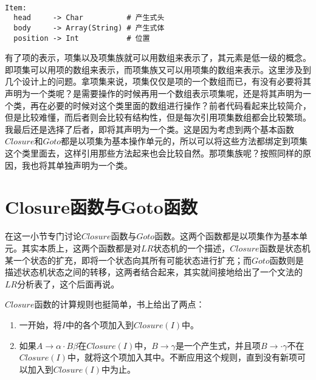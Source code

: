 \begin{verbatim}

Item:
  head     -> Char          # 产生式头
  body     -> Array(String) # 产生式体
  position -> Int           # 位置
\end{verbatim}

有了项的表示，项集以及项集族就可以用数组来表示了，其元素是低一级的概念。即项集可以用项的数组来表示，而项集族又可以用项集的数组来表示。这里涉及到几个设计上的问题。拿项集来说，项集仅仅是项的一个数组而已，有没有必要将其声明为一个类呢？是需要操作的时候再用一个数组表示项集呢，还是将其声明为一个类，再在必要的时候对这个类里面的数组进行操作？前者代码看起来比较简介，但是比较难懂，而后者则会比较有结构性，但是每次引用项集数组都会比较繁琐。我最后还是选择了后者，即将其声明为一个类。这是因为考虑到两个基本函数$Closure$和$Goto$都是以项集为基本操作单元的，所以可以将这些方法都绑定到项集这个类里面去，这样引用那些方法起来也会比较自然。那项集族呢？按照同样的原因，我也将其单独声明为一个类。

\section{Closure函数与Goto函数}

在这一小节专门讨论$Closure$函数与$Goto$函数。这两个函数都是以项集作为基本单元。其实本质上，这两个函数都是对$LR$状态机的一个描述，$Closure$函数是状态机某一个状态的扩充，即将一个状态向其所有可能状态进行扩充；而$Goto$函数则是描述状态机状态之间的转移，这两者结合起来，其实就间接地给出了一个文法的$LR$分析表了，这个后面再说。

$Closure$函数的计算规则也挺简单，书上给出了两点：

\begin{enumerate}
    \item 一开始，将$I$中的各个项加入到$Closure(I)$中。
    \item 如果$A \rightarrow \alpha \cdot B \beta$在$Closure(I)$中，$B \rightarrow \gamma$是一个产生式，并且项$B \rightarrow \cdot \gamma$不在$Closure(I)$中，就将这个项加入其中。不断应用这个规则，直到没有新项可以加入到$Closure(I)$中为止。
\end{enumerate}

\newpage


